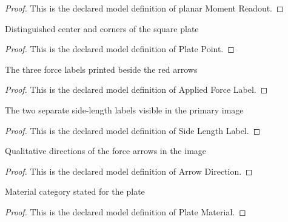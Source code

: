 \begin{proof}
  This is the declared model definition of planar Moment Readout.
\end{proof}
\begin{definition}
  \label{def:physics:phyx-mini-0777:phyxminiproblems-problemphyxmini0777-platepoint}
  Distinguished center and corners of the square plate
\end{definition}
\begin{proof}
  This is the declared model definition of Plate Point.
\end{proof}
\begin{definition}
  \label{def:physics:phyx-mini-0777:phyxminiproblems-problemphyxmini0777-appliedforcelabel}
  The three force labels printed beside the red arrows
\end{definition}
\begin{proof}
  This is the declared model definition of Applied Force Label.
\end{proof}
\begin{definition}
  \label{def:physics:phyx-mini-0777:phyxminiproblems-problemphyxmini0777-sidelengthlabel}
  The two separate side-length labels visible in the primary image
\end{definition}
\begin{proof}
  This is the declared model definition of Side Length Label.
\end{proof}
\begin{definition}
  \label{def:physics:phyx-mini-0777:phyxminiproblems-problemphyxmini0777-arrowdirection}
  Qualitative directions of the force arrows in the image
\end{definition}
\begin{proof}
  This is the declared model definition of Arrow Direction.
\end{proof}
\begin{definition}
  \label{def:physics:phyx-mini-0777:phyxminiproblems-problemphyxmini0777-platematerial}
  Material category stated for the plate
\end{definition}
\begin{proof}
  This is the declared model definition of Plate Material.
\end{proof}
